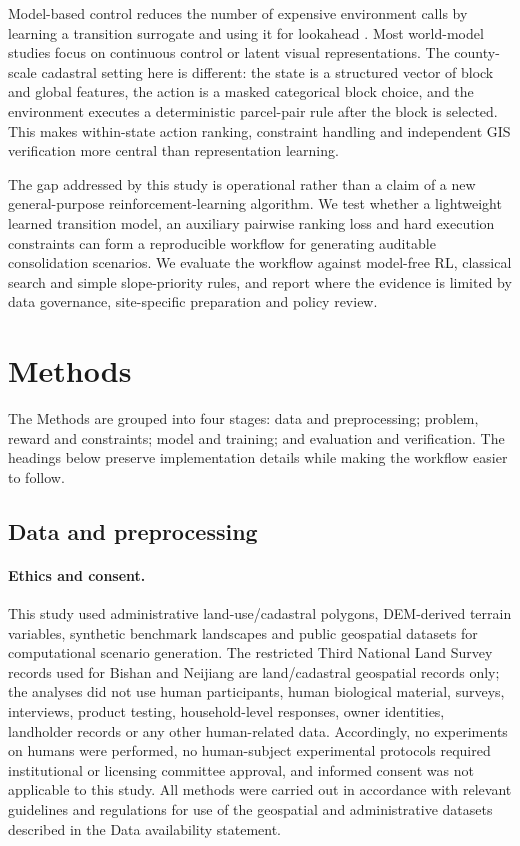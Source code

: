 \documentclass[11pt]{article}
\begin{document}
Model-based control reduces the number of expensive environment calls by learning a transition surrogate and using it for lookahead \citep{chua2018deep,janner2019trust}. Most world-model studies focus on continuous control or latent visual representations. The county-scale cadastral setting here is different: the state is a structured vector of block and global features, the action is a masked categorical block choice, and the environment executes a deterministic parcel-pair rule after the block is selected. This makes within-state action ranking, constraint handling and independent GIS verification more central than representation learning.

The gap addressed by this study is operational rather than a claim of a new general-purpose reinforcement-learning algorithm. We test whether a lightweight learned transition model, an auxiliary pairwise ranking loss and hard execution constraints can form a reproducible workflow for generating auditable consolidation scenarios. We evaluate the workflow against model-free RL, classical search and simple slope-priority rules, and report where the evidence is limited by data governance, site-specific preparation and policy review.

\section{Methods}
\label{sec:methods}

The Methods are grouped into four stages: data and preprocessing; problem, reward and constraints; model and training; and evaluation and verification. The headings below preserve implementation details while making the workflow easier to follow.

\subsection{Data and preprocessing}

\paragraph{Ethics and consent.}\label{sec:ethics-consent}

This study used administrative land-use/cadastral polygons, DEM-derived terrain variables, synthetic benchmark landscapes and public geospatial datasets for computational scenario generation. The restricted Third National Land Survey records used for Bishan and Neijiang are land/cadastral geospatial records only; the analyses did not use human participants, human biological material, surveys, interviews, product testing, household-level responses, owner identities, landholder records or any other human-related data. Accordingly, no experiments on humans were performed, no human-subject experimental protocols required institutional or licensing committee approval, and informed consent was not applicable to this study. All methods were carried out in accordance with relevant guidelines and regulations for use of the geospatial and administrative datasets described in the Data availability statement.
\end{document}
